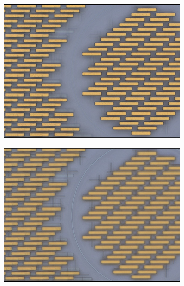 \begin{figure}
	\centering
	\begin{subfigure}[b]{0.45\textwidth}
		\includegraphics[width=\textwidth]{imgs/jpg/ligentec/top}
		\caption{}
	\end{subfigure}
	\begin{subfigure}[b]{0.45\textwidth}
		\includegraphics[width=\textwidth]{imgs/jpg/ligentec/dev}
		\caption{}
	\end{subfigure}
	\begin{subfigure}[b]{0.45\textwidth}

\end{subfigure}
\end{figure}
